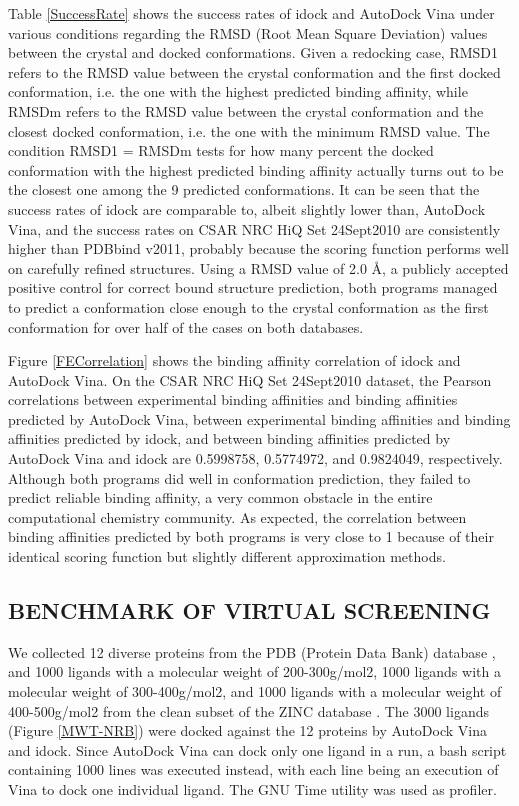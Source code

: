 \documentclass[12pt]{article}
\begin{document}
Table \ref{SuccessRate} shows the success rates of idock and AutoDock Vina under various conditions regarding the RMSD (Root Mean Square Deviation) values between the crystal and docked conformations. Given a redocking case, RMSD1 refers to the RMSD value between the crystal conformation and the first docked conformation, i.e. the one with the highest predicted binding affinity, while RMSDm refers to the RMSD value between the crystal conformation and the closest docked conformation, i.e. the one with the minimum RMSD value. The condition RMSD1 = RMSDm tests for how many percent the docked conformation with the highest predicted binding affinity actually turns out to be the closest one among the 9 predicted conformations. It can be seen that the success rates of idock are comparable to, albeit slightly lower than, AutoDock Vina, and the success rates on CSAR NRC HiQ Set 24Sept2010 are consistently higher than PDBbind v2011, probably because the scoring function performs well on carefully refined structures. Using a RMSD value of 2.0 \AA, a publicly accepted positive control for correct bound structure prediction, both programs managed to predict a conformation close enough to the crystal conformation as the first conformation for over half of the cases on both databases.

Figure \ref{FECorrelation} shows the binding affinity correlation of idock and AutoDock Vina. On the CSAR NRC HiQ Set 24Sept2010 dataset, the Pearson correlations between experimental binding affinities and binding affinities predicted by AutoDock Vina, between experimental binding affinities and binding affinities predicted by idock, and between binding affinities predicted by AutoDock Vina and idock are 0.5998758, 0.5774972, and 0.9824049, respectively. Although both programs did well in conformation prediction, they failed to predict reliable binding affinity, a very common obstacle in the entire computational chemistry community. As expected, the correlation between binding affinities predicted by both programs is very close to 1 because of their identical scoring function but slightly different approximation methods.

\subsection*{\sffamily \large BENCHMARK OF VIRTUAL SCREENING}

We collected 12 diverse proteins from the PDB (Protein Data Bank) database \cite{540,537}, and 1000 ligands with a molecular weight of 200-300g/mol2, 1000 ligands with a molecular weight of 300-400g/mol2, and 1000 ligands with a molecular weight of 400-500g/mol2 from the clean subset of the ZINC database \cite{532,1178}. The 3000 ligands (Figure \ref{MWT-NRB}) were docked against the 12 proteins by AutoDock Vina and idock. Since AutoDock Vina can dock only one ligand in a run, a bash script containing 1000 lines was executed instead, with each line being an execution of Vina to dock one individual ligand. The GNU Time utility was used as profiler.
\end{document}
